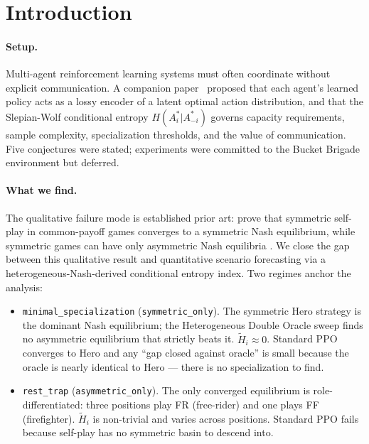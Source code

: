 \documentclass{article}
\begin{document}
\section{Introduction}

\paragraph{Setup.}
Multi-agent reinforcement learning systems must often coordinate without
explicit communication.  A companion paper~\cite{walters2026slepianwolf}
proposed that each agent's learned policy acts as a lossy encoder of a latent
optimal action distribution, and that the Slepian-Wolf conditional entropy
$H(A_i^*|A_{-i}^*)$ governs capacity requirements, sample complexity,
specialization thresholds, and the value of communication.  Five conjectures
were stated; experiments were committed to the Bucket Brigade environment but
deferred.

\paragraph{What we find.}
The qualitative failure mode is established prior art:
\cite{emmons2022symmetric} prove that symmetric self-play in common-payoff
games converges to a symmetric Nash equilibrium, while symmetric games can
have only asymmetric Nash equilibria \cite{fey2012symmetric}.  We close the
gap between this qualitative result and quantitative scenario forecasting via
a heterogeneous-Nash-derived conditional entropy index.  Two regimes anchor
the analysis:

\begin{itemize}
  \item \texttt{minimal\_specialization} (\texttt{symmetric\_only}).  The
    symmetric Hero strategy is the dominant Nash equilibrium; the
    Heterogeneous Double Oracle sweep finds no asymmetric equilibrium that
    strictly beats it.  $\tilde{H}_i \approx 0$.  Standard PPO converges to
    Hero and any ``gap closed against oracle'' is small because the oracle is
    nearly identical to Hero — there is no specialization to find.
  \item \texttt{rest\_trap} (\texttt{asymmetric\_only}).  The only converged
    equilibrium is role-differentiated: three positions play \textsc{FR}
    (free-rider) and one plays \textsc{FF} (firefighter).  $\tilde{H}_i$ is
    non-trivial and varies across positions.  Standard PPO fails because
    self-play has no symmetric basin to descend into.
\end{itemize}
\end{document}
